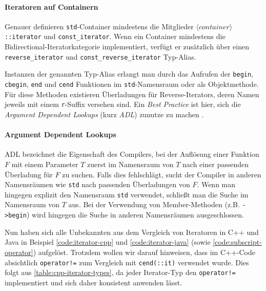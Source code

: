 \documentclass[runningheads]{llncs}
\begin{document}
\paragraph{Iteratoren auf Containern}
Genauer definieren \texttt{std}-Container mindestens die Mitglieder \texttt{$\langle{container}\rangle$::iterator} und \texttt{const\_iterator}.
Wenn ein Container mindestens die Bidirectional-Iteratorkategorie implementiert, verfügt er zusätzlich über einen \texttt{reverse\_iterator} und \texttt{const\_reverse\_iterator} Typ-Alias.

Instanzen der genannten Typ-Alias erlangt man durch das Aufrufen der \texttt{begin}, \texttt{cbegin}, \texttt{end} und \texttt{cend} Funktionen im \texttt{std}-Namensraum oder als Objektmethode.
Für diese Methoden existieren Überladungen für Reverse-Iterators, deren Namen jeweils mit einem \texttt{r}-Suffix versehen sind.
Ein \textit{Best Practice} ist hier, sich die \textit{Argument Dependent Lookups} (kurz \textit{ADL}) zunutze zu machen \cite[S.608]{profcpp}.

\paragraph{Argument Dependent Lookups}
ADL bezeichnet die Eigenschaft des Compilers, bei der Auflösung einer Funktion $F$ mit einem Parameter $T$ zuerst im Namensraum von $T$ nach einer passenden Überladung für $F$ zu suchen.
Falls dies fehlschlägt, sucht der Compiler in anderen Namensräumen wie \texttt{std} nach passenden Überladungen von $F$.
Wenn man hingegen explizit den Namensraum \texttt{std} verwendet, schließt man die Suche im Namensraum von $T$ aus.
Bei der Verwendung von Member-Methoden (z.B. \texttt{->begin}) wird hingegen die Suche in anderen Namensräumen ausgeschlossen.


Nun haben sich alle Unbekannten aus dem Vergleich von Iteratoren in C++ und Java in Beispiel \autoref{code:iterator-cpp} und \ref{code:iterator-java} (sowie \ref{code:subscript-operator}) aufgelöst.
Trotzdem wollen wir darauf hinweisen, dass im C++-Code absichtlich \texttt{operator!=} zum Vergleich mit \texttt{cend(::it)} verwendet wurde.
Dies folgt aus \autoref{table:cpp-iterator-types}, da jeder Iterator-Typ den \texttt{operator!=} implementiert und sich daher konsistent anwenden lässt.
\end{document}

